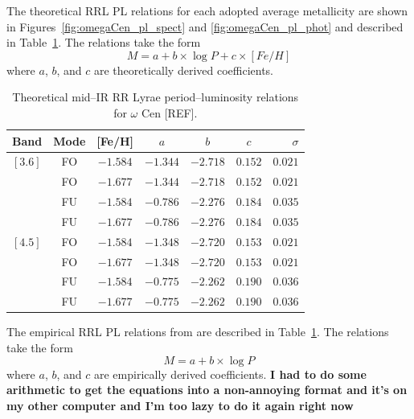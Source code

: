 \documentclass[a4paper,fleqn,usenatbib]{mnras}
\begin{document}
The theoretical RRL PL relations for each adopted average metallicity are shown in Figures~\ref{fig:omegaCen_pl_spect} and \ref{fig:omegaCen_pl_phot} and described in Table~\ref{tab:pl_table_theo}. The relations take the form
\begin{equation}M = a + b\times\log P + c\times[Fe/H]\end{equation}
where $a$, $b$, and $c$ are theoretically derived coefficients.

\begin{table}
\centering
\caption{Theoretical mid--IR RR Lyrae period--luminosity relations for $\omega$ Cen [REF].} 
\label{tab:pl_table_theo}
\begin{tabular}{l|c|c|c|c|c|r} 
\hline \hline
Band & Mode  & [Fe/H]  & $a$   & $b$   & $c$   & $\sigma$ \\
\hline
$[3.6]$ & FO & $-1.584$ & $-1.344$ & $-2.718$ & $0.152$ & $0.021$ \\
            & FO & $-1.677$ & $-1.344$ & $-2.718$ & $0.152$ & $0.021$ \\
            & FU & $-1.584$ & $-0.786$ & $-2.276$ & $0.184$ & $0.035$ \\
            & FU & $-1.677$ & $-0.786$ & $-2.276$ & $0.184$ & $0.035$ \\
$[4.5]$ & FO & $-1.584$ & $-1.348$ & $-2.720$ & $0.153$ & $0.021$ \\         
            & FO & $-1.677$ & $-1.348$ & $-2.720$ & $0.153$ & $0.021$ \\         
            & FU & $-1.584$ & $-0.775$ & $-2.262$ & $0.190$ & $0.036$ \\
            & FU & $-1.677$ & $-0.775$ & $-2.262$ & $0.190$ & $0.036$ \\
            \hline
\end{tabular}
\end{table}

The empirical RRL PL relations from \citet{2015arXiv150507858N} are described in Table~\ref{tab:pl_table_theo}. The relations take the form
\begin{equation}M = a + b\times\log P \end{equation}
where $a$, $b$, and $c$ are empirically derived coefficients. {\bf I had to do some arithmetic to get the equations into a non-annoying format and it's on my other computer and I'm too lazy to do it again right now }
\end{document}
